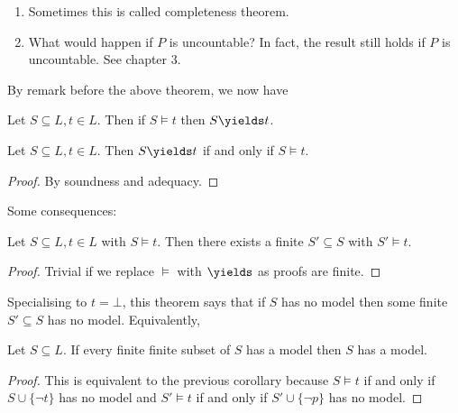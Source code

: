 \documentclass[a4paper]{article}
\begin{document}
\begin{remark}\leavevmode
  \begin{enumerate}
  \item Sometimes this is called completeness theorem.
  \item What would happen if \(P\) is uncountable? In fact, the result still holds if \(P\) is uncountable. See chapter 3.
  \end{enumerate}
\end{remark}

By remark before the above theorem, we now have

\begin{corollary}[Adequacy]
  Let \(S \subseteq L, t \in L\). Then if \(S \models t\) then \(S \yields t\).
\end{corollary}

\begin{theorem}
  Let \(S \subseteq L, t \in L\). Then \(S \yields t\) if and only if \(S \models t\).
\end{theorem}

\begin{proof}
  By soundness and adequacy.
\end{proof}

Some consequences:

\begin{corollary}
  Let \(S \subseteq L, t \in L\) with \(S \models t\). Then there exists a finite \(S' \subseteq S\) with \(S' \models t\).
\end{corollary}

\begin{proof}
  Trivial if we replace \(\models\) with \(\yields\) as proofs are finite.
\end{proof}

Specialising to \(t = \bot\), this theorem says that if \(S\) has no model then some finite \(S' \subseteq S\) has no model. Equivalently,

\begin{corollary}
  Let \(S \subseteq L\). If every finite finite subset of \(S\) has a model then \(S\) has a model.
\end{corollary}

\begin{proof}
  This is equivalent to the previous corollary because \(S \models t\) if and only if \(S \cup \{\neg t\}\) has no model and \(S' \models t\) if and only if \(S' \cup \{\neg p\}\) has no model.
\end{proof}
\end{document}
